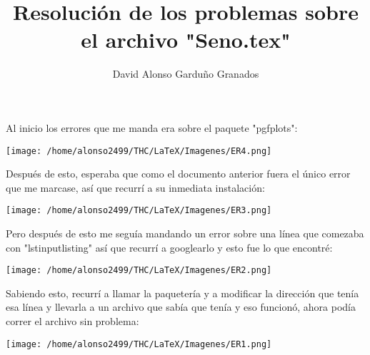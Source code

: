 \documentclass[french]{article}
\title{Resolución de los problemas sobre el archivo "Seno.tex"}
\author{David Alonso Garduño Granados}
\begin{document}
	\maketitle
	
Al inicio los errores que me manda era sobre el paquete "pgfplots":

\texttt{[image: /home/alonso2499/THC/LaTeX/Imagenes/ER4.png]} 

Después de esto, esperaba que como el documento anterior fuera el único error que me marcase, así que recurrí a su inmediata instalación:

\texttt{[image: /home/alonso2499/THC/LaTeX/Imagenes/ER3.png]}

Pero después de esto me seguía mandando un error sobre una línea que comezaba con "lstinputlisting" así que recurrí a googlearlo y esto fue lo que encontré:

\texttt{[image: /home/alonso2499/THC/LaTeX/Imagenes/ER2.png]}

Sabiendo esto, recurrí a llamar la paquetería y a modificar la dirección que tenía esa línea y llevarla a un archivo que sabía que tenía y eso funcionó, ahora podía correr el archivo sin problema:

\texttt{[image: /home/alonso2499/THC/LaTeX/Imagenes/ER1.png]}
\end{document}
